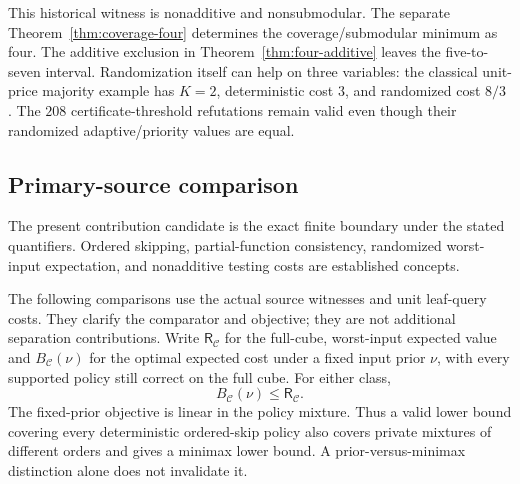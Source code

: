 \documentclass[pdflatex,sn-mathphys-num]{sn-jnl}
\newcommand{\RR}{\mathsf{R}}
\theoremstyle{thmstyleone}
\theoremstyle{thmstylethree}
\theoremstyle{thmstyletwo}
\begin{document}
This historical witness is nonadditive and nonsubmodular. The separate
Theorem~\ref{thm:coverage-four} determines the coverage/submodular minimum
as four. The additive exclusion in Theorem~\ref{thm:four-additive} leaves
the five-to-seven interval. Randomization itself can help on three variables:
the classical unit-price majority example has $K=2$, deterministic
cost $3$, and randomized cost $8/3$ \cite{amano2011directional}.
The $208$ certificate-threshold refutations remain valid even though
their randomized adaptive/priority values are equal.

\subsection{Primary-source comparison}
\label{sec:generic-related-scope}
The present contribution candidate is the exact finite boundary under
the stated quantifiers. Ordered skipping, partial-function consistency,
randomized worst-input expectation, and nonadditive testing costs
are established concepts.

The following comparisons use the actual source witnesses and unit
leaf-query costs. They clarify the comparator and objective; they are
not additional separation contributions. Write $\RR_{\mathcal C}$ for
the full-cube, worst-input expected value and $B_{\mathcal C}(\nu)$ for
the optimal expected cost under a fixed input prior $\nu$, with every
supported policy still correct on the full cube. For either class,
\[
 B_{\mathcal C}(\nu)\leq\RR_{\mathcal C}.
\]
The fixed-prior objective is linear in the policy mixture. Thus a valid
lower bound covering every deterministic ordered-skip policy also covers
private mixtures of different orders and gives a minimax lower bound.
A prior-versus-minimax distinction alone does not invalidate it.
\end{document}
